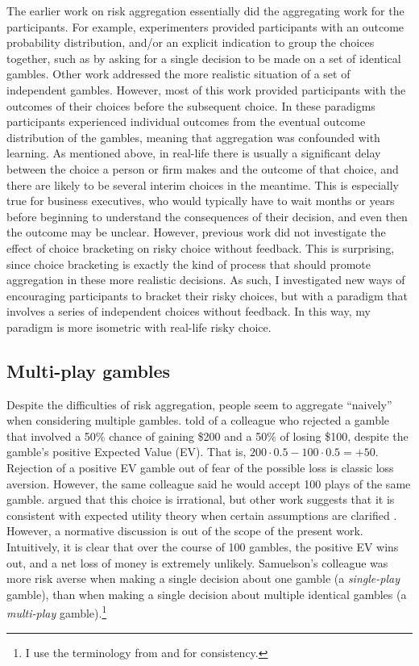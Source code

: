 \documentclass[a4paper, nobind, dvipsnames]{templates/ociamthesis}
\theoremstyle{definition}
\theoremstyle{definition}
\theoremstyle{definition}
\theoremstyle{definition}
\theoremstyle{remark}
\begin{document}
The earlier work on risk aggregation essentially did the aggregating work for
the participants. For example, experimenters provided participants with an
outcome probability distribution, and/or an explicit indication to group the
choices together, such as by asking for a single decision to be made on a set of
identical gambles. Other work addressed the more realistic situation of a set of
independent gambles. However, most of this work provided participants with the
outcomes of their choices before the subsequent choice. In these paradigms
participants experienced individual outcomes from the eventual outcome
distribution of the gambles, meaning that aggregation was confounded with
learning. As mentioned above, in real-life there is usually a significant delay
between the choice a person or firm makes and the outcome of that choice, and
there are likely to be several interim choices in the meantime. This is
especially true for business executives, who would typically have to wait months
or years before beginning to understand the consequences of their decision, and
even then the outcome may be unclear. However, previous work did not investigate
the effect of choice bracketing on risky choice without feedback. This is
surprising, since choice bracketing is exactly the kind of process that should
promote aggregation in these more realistic decisions. As such, I investigated
new ways of encouraging participants to bracket their risky choices, but with a
paradigm that involves a series of independent choices without feedback. In this
way, my paradigm is more isometric with real-life risky choice.

\subsection{Multi-play gambles}

Despite the difficulties of risk aggregation, people seem to aggregate ``naively''
when considering multiple gambles. \textcite{samuelson1963} told of a colleague who
rejected a gamble that involved a 50\% chance of gaining \$200 and a 50\% of losing
\$100, despite the gamble's positive Expected Value (EV). That is, \(200 \cdot 0.5 - 100 \cdot 0.5 = +50\). Rejection of a positive EV gamble out of fear of the
possible loss is classic loss aversion. However, the same colleague said he
would accept 100 plays of the same gamble. \textcite{samuelson1963} argued that this
choice is irrational, but other work suggests that it is consistent with
expected utility theory when certain assumptions are clarified \autocites[e.g.,][]{ross1999,aloysius2007}. However, a normative discussion is out of the scope of the
present work. Intuitively, it is clear that over the course of 100 gambles, the
positive EV wins out, and a net loss of money is extremely unlikely. Samuelson's
colleague was more risk averse when making a single decision about one gamble (a
\emph{single-play} gamble), than when making a single decision about multiple
identical gambles (a \emph{multi-play} gamble).\footnote{I use the terminology from \textcite{bristow2011} and \textcite{camilleri2013} for
  consistency.}
\end{document}
